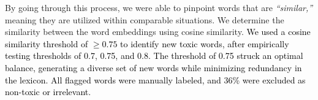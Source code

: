     
    
    

By going through this process, we were able to pinpoint words that are \textit{``similar,''} meaning they are utilized within comparable situations.
We determine the similarity between the word embeddings using cosine similarity. \textcolor{black}{We used a cosine similarity threshold of $\geq 0.75$ to identify new toxic words, after empirically testing thresholds of 0.7, 0.75, and 0.8. The threshold of 0.75 struck an optimal balance, generating a diverse set of new words while minimizing redundancy in the lexicon. All flagged words were manually labeled, and 36\% were excluded as non-toxic or irrelevant.}

